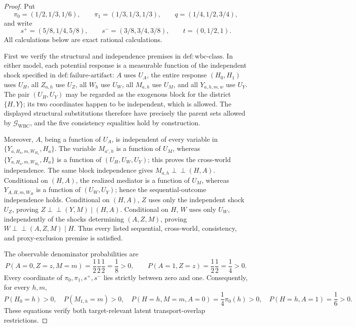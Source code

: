 \documentclass{article}
\begin{document}
\begin{proof}
Put
\[
 \pi _0=(1/2,1/3,1/6),\qquad \pi _1=(1/3,1/3,1/3),
 \qquad q=(1/4,1/2,3/4),
\]
and write
\[
 s^+=(5/8,1/4,5/8),\qquad s^-=(3/8,3/4,3/8),
 \qquad t=(0,1/2,1).
\]
All calculations below are exact rational calculations.

First we verify the structural and independence premises in
\(\mathrm{def{:}wbc\text{-}class}\).  In either model, each potential response is
a measurable function of the independent shock specified in
\(\mathrm{def{:}failure\text{-}artifact}\): \(A\) uses \(U_A\), the entire
response \((H_0,H_1)\) uses \(U_H\), all \(Z_{a,h}\) use \(U_Z\), all
\(W_h\) use \(U_W\), all \(M_{a,h}\) use \(U_M\), and all
\(Y_{a,h,m,w}\) use \(U_Y\).  The pair \((U_H,U_Y)\) may be regarded as
the exogenous block for the district \(\{H,Y\}\); its two coordinates happen
to be independent, which is allowed.  The displayed structural substitutions
therefore have precisely the parent sets allowed by
\(\mathcal G_{\mathrm{WBC}}\), and the five consistency equalities hold by
construction.

Moreover, \(A\), being a function of \(U_A\), is independent of every
variable in
\(\{Y_{a,H_a,m,W_{H_a}},H_a\}\).  The variable \(M_{a',h}\) is a
function of \(U_M\), whereas
\(\{Y_{a,H_a,m,W_{H_a}},H_a\}\) is a function of
\((U_H,U_W,U_Y)\); this proves the cross-world independence.  The same
block independence gives \(M_{a,h}\mathbin{\perp\!\!\!\perp}(H,A)\).
Conditional on \((H,A)\), the realized mediator is a function of \(U_M\),
whereas \(Y_{A,H,m,W_H}\) is a function of \((U_W,U_Y)\); hence the
sequential-outcome independence holds.  Conditional on \((H,A)\), \(Z\)
uses only the independent shock \(U_Z\), proving
\(Z\mathbin{\perp\!\!\!\perp}(Y,M)\mid(H,A)\).  Conditional on \(H\),
\(W\) uses only \(U_W\), independently of the shocks determining
\((A,Z,M)\), proving
\(W\mathbin{\perp\!\!\!\perp}(A,Z,M)\mid H\).  Thus every listed
sequential, cross-world, consistency, and proxy-exclusion premise is
satisfied.

The observable denominator probabilities are
\[
 P(A=0,Z=z,M=m)=\frac12\frac12\frac12=\frac18>0,
 \qquad
 P(A=1,Z=z)=\frac12\frac12=\frac14>0.
\]
Every coordinate of \(\pi _0,\pi _1,s^+,s^-\) lies strictly between zero
and one.  Consequently, for every \(h,m\),
\[
 P(H_0=h)>0,\quad P(M_{1,h}=m)>0,\quad
 P(H=h,M=m,A=0)=\frac14\pi _0(h)>0,\quad
 P(H=h,A=1)=\frac16>0.
\]
These equations verify both target-relevant latent transport-overlap
restrictions.


\end{proof}
\end{document}
